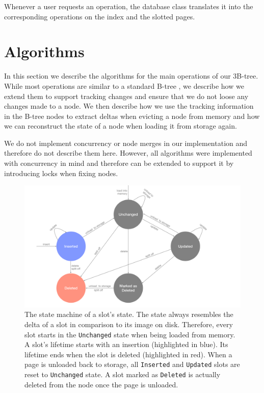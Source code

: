 Whenever a user requests an operation, the database class translates it into the corresponding operations on the index and the slotted pages.

\section{Algorithms}
\label{sec:algorithms}
In this section we describe the algorithms for the main operations of our 3B-tree.
While most operations are similar to a standard B-tree \cite{mdbs2024slides}, we describe how we extend them to support tracking changes and ensure that we do not loose any changes made to a node.
We then describe how we use the tracking information in the B-tree nodes to extract deltas when evicting a node from memory and how we can reconstruct the state of a node when loading it from storage again.

We do not implement concurrency or node merges in our implementation and therefore do not describe them here.
However, all algorithms were implemented with concurrency in mind and therefore can be extended to support it by introducing locks when fixing nodes.

\begin{figure}[htbp]
  \centering
  \includegraphics[width=1\textwidth]{figures/slot_states.pdf}
  \caption{The state machine of a slot's state. The state always resembles the delta of a slot in comparison to its image on disk. Therefore, every slot starts in the \texttt{Unchanged} state when being loaded from memory. A slot's lifetime starts with an insertion (highlighted in blue). Its lifetime ends when the slot is deleted (highlighted in red). When a page is unloaded back to storage, all \texttt{Inserted} and \texttt{Updated} slots are reset to \texttt{Unchanged} state. A slot marked as \texttt{Deleted} is actually deleted from the node once the page is unloaded.}
  \label{fig:slot-states}
\end{figure}

